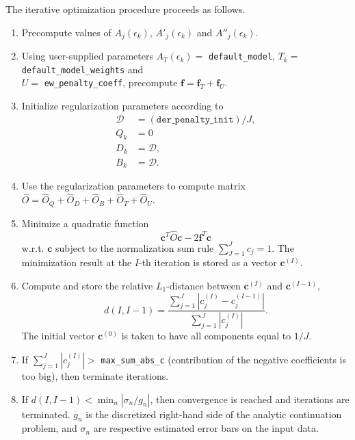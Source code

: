 \documentclass[]{article}
\begin{document}
The iterative optimization procedure proceeds as follows.
\begin{enumerate}
    \item Precompute values of $A_j(\epsilon_k)$, $A'_j(\epsilon_k)$ and $A''_j(\epsilon_k)$.

    \item Using user-supplied parameters $A_T(\epsilon_k) =$ \verb|default_model|, $T_k =$ \verb|default_model_weights| and\\ $U=$ \verb|ew_penalty_coeff|, precompute $\mathbf{f} = \mathbf{f}_T + \mathbf{f}_U$.

    \item Initialize regularization parameters according to
    \begin{align*}
        \mathcal{D} &= (\mathtt{der\_penalty\_init}) / J,\\
        Q_k &= 0 \\
        D_k &= \mathcal{D},\\
        B_k &= \mathcal{D}.
    \end{align*}

    \item Use the regularization parameters to compute matrix $\hat O = \hat O_Q + \hat O_D + \hat O_B + \hat O_T + \hat O_U$.

    \item Minimize a quadratic function
    \begin{equation}
        \mathbf{c}^T \hat O \mathbf{c} -2\mathbf{f}^T\mathbf{c}
    \end{equation}
    w.r.t. $\mathbf{c}$ subject to the normalization sum rule $\sum_{J=1}^J c_j = 1$. The minimization result at the $I$-th iteration is stored as a vector
    $\mathbf{c}^{(I)}$.

    \item Compute and store the relative $L_1$-distance between
    $\mathbf{c}^{(I)}$ and $\mathbf{c}^{(I-1)}$,
    \begin{equation}
        d(I, I-1) = \frac{\sum_{j=1}^J |c^{(I)}_j - c^{(I-1)}_j|}
                         {\sum_{j=1}^J |c^{(I)}_j|}.
    \end{equation}
    The initial vector $\mathbf{c}^{(0)}$ is taken to have all components equal to $1/J$.

    \item If $\sum_{j=1}^J |c^{(I)}_j| >$ \verb|max_sum_abs_c| (contribution of the negative coefficients is too big), then terminate iterations.

    \item If $d(I, I-1) < \min_n |\sigma_n/g_n|$, then convergence is reached and iterations are terminated. $g_n$ is the discretized right-hand side of the analytic continuation problem, and $\sigma_n$ are respective estimated error bars on the input data.


\end{enumerate}
\end{document}
